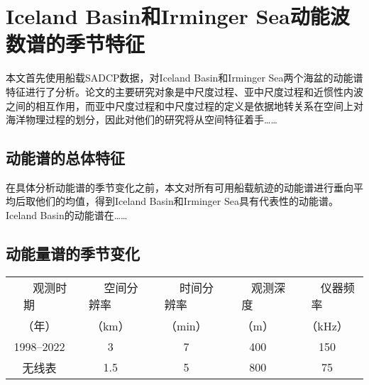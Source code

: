 \chapter{Iceland Basin和Irminger Sea动能波数谱的季节特征}

本文首先使用船载SADCP数据，对Iceland Basin和Irminger Sea两个海盆的动能谱特征进行了分析。论文的主要研究对象是中尺度过程、亚中尺度过程和近惯性内波之间的相互作用，而亚中尺度过程和中尺度过程的定义是依据地转关系在空间上对海洋物理过程的划分，因此对他们的研究将从空间特征着手……

\section{动能谱的总体特征}

在具体分析动能谱的季节变化之前，本文对所有可用船载航迹的动能谱进行垂向平均后取他们的均值，得到Iceland Basin和Irminger Sea具有代表性的动能谱。Iceland Basin的动能谱在……

\section{动能量谱的季节变化}


\begin{table}[htb]
  \centering\small
  \label{tab:exampletable}
  \begin{tabular}{ccccc}
    \hline\toprule
    ~~~ 观测时期 ~~~   & ~~~ 空间分辨率 ~~~  & ~~~ 时间分辨率 ~~~  & ~~~ 观测深度 ~~~ & ~~~ 仪器频率 ~~~  \\
    （年） & （km） & （min） & （m） & （kHz）  \\
    \midrule
    1998--2022 & 3 & 7 & 400 & 150 \\
    无线表 & 1.5 & 5 & 800 & 75   \\
    \bottomrule\hline
  \end{tabular}
\end{table}


